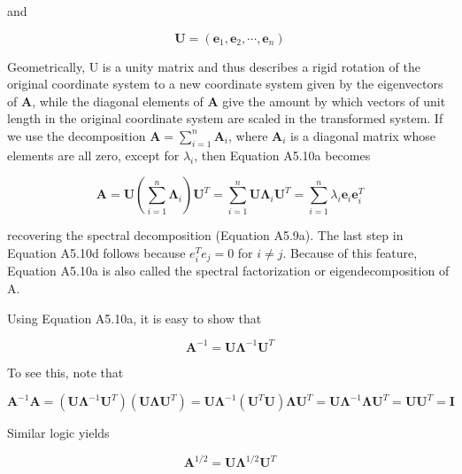 \documentclass{article}
\begin{document}
and

\begin{equation}
\mathbf{U}=\left(\mathbf{e}_{1},\mathbf{e}_{2},\cdots,\mathbf{e}_{n}\right)
\end{equation}

Geometrically, U is a unity matrix and thus describes a rigid rotation of the original coordinate system to a new coordinate system given by the eigenvectors of  $ \mathbf{A} $, while the diagonal elements of  $ \mathbf{A} $ give the amount by which vectors of unit length in the original coordinate system are scaled in the transformed system. If we use the decomposition  $ \mathbf{A} = \sum_{i=1}^{n} \mathbf{A}_i $, where  $ \mathbf{A}_i $ is a diagonal matrix whose elements are all zero, except for  $ \lambda_i $, then Equation A5.10a becomes

\begin{equation}
\mathbf{A}=\mathbf{U}\left(\sum_{i=1}^{n}\boldsymbol{\Lambda}_{i}\right)\mathbf{U}^{T}=\sum_{i=1}^{n}\mathbf{U}\boldsymbol{\Lambda}_{i}\mathbf{U}^{T}=\sum_{i=1}^{n}\lambda_{i}\mathbf{e}_{i}\mathbf{e}_{i}^{T}
\end{equation}

recovering the spectral decomposition (Equation A5.9a). The last step in Equation A5.10d follows because  $ e_i^T e_j = 0 $ for  $ i \neq j $. Because of this feature, Equation A5.10a is also called the spectral factorization or eigendecomposition of A.

Using Equation A5.10a, it is easy to show that

\begin{equation}
\mathbf{A}^{-1}=\mathbf{U}\boldsymbol{\Lambda}^{-1}\mathbf{U}^{T}
\end{equation}

To see this, note that

\begin{equation}
\mathbf{A}^{-1}\mathbf{A}=\left(\mathbf{U}\boldsymbol{\Lambda}^{-1}\mathbf{U}^{T}\right)\left(\mathbf{U}\boldsymbol{\Lambda}\mathbf{U}^{T}\right)=\mathbf{U}\boldsymbol{\Lambda}^{-1}\left(\mathbf{U}^{T}\mathbf{U}\right)\boldsymbol{\Lambda}\mathbf{U}^{T}=\mathbf{U}\boldsymbol{\Lambda}^{-1}\boldsymbol{\Lambda}\mathbf{U}^{T}=\mathbf{U}\mathbf{U}^{T}=\mathbf{I}
\end{equation}

Similar logic yields

\begin{equation}
\mathbf{A}^{1/2}=\mathbf{U}\boldsymbol{\Lambda}^{1/2}\mathbf{U}^{T}
\end{equation}
\end{document}
